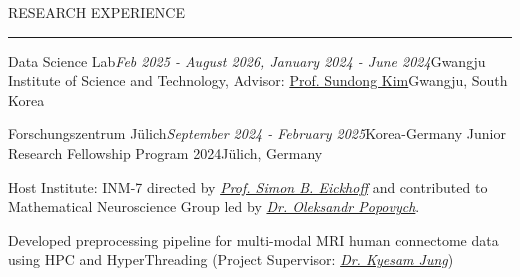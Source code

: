 \documentclass{resume} %
\renewenvironment{rSection}[2][]{
\vspace{-0.5 em} %
\sectionskip
\noindent\textcolor{RoyalPurple}{\MakeUppercase{#2}}\hfill{\footnotesize #1}\par
\sectionlineskip
\hrule
\begin{list}{}{
\setlength{\leftmargin}{1.5em}
}
\item[]
}{
\end{list}
}
\begin{document}
\begin{rSection}{Research Experience}
\begin{rSubsection}{Data Science Lab}{\em Feb 2025 - August 2026, January 2024 - June 2024}{Gwangju Institute of Science and Technology, Advisor: \href{https://sundong.kim/}{Prof. Sundong Kim}}{Gwangju, South Korea}
\end{rSubsection}


\vspace{-0.75 em}

\begin{rSubsection}{Forschungszentrum Jülich}{\em September 2024 - February 2025}{Korea-Germany Junior Research Fellowship Program 2024}{Jülich, Germany}
\vspace{-0.3 em}
\item Host Institute: INM-7 directed by \href{https://scholar.google.com/citations?user=wjpISMAAAAAJ&hl=de}{\emph{Prof. Simon B. Eickhoff}} and contributed to Mathematical Neuroscience Group led by \href{https://www.researchgate.net/scientific-contributions/Oleksandr-V-Popovych-39245813}{\emph{Dr. Oleksandr Popovych}}.
\item Developed preprocessing pipeline for multi-modal MRI human connectome data using HPC and HyperThreading (Project Supervisor: \href{https://www.researchgate.net/profile/Kyesam-Jung}{\emph{Dr. Kyesam Jung}})
\end{rSubsection}


\end{rSection}
\end{document}
